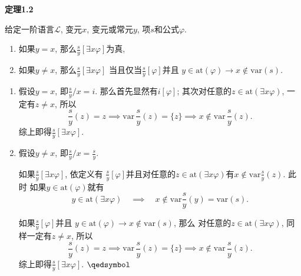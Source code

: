 \documentclass[UTF8]{ctexart}
\begin{document}
\vspace{10pt}

\hypertarget{sec:定理1.2}{}
\noindent\textbf{定理1.2}

给定一阶语言$\mathcal{L}$, 变元$x$, 变元或常元$y$, 项$s$和公式$\varphi$.
\vspace{3pt}
\begin{enumerate}
    \item 如果$y=x$, 那么$\displaystyle\frac{s}{y}[\exists x\varphi]$为真,
    \vspace{6pt}
    \item 如果$y\neq x$, 那么$\displaystyle\frac{s}{y}[\exists x\varphi]$
    当且仅当$\displaystyle\frac{s}{y}[\varphi]$并且
    $y\in\mathrm{at}(\varphi)\to x\notin\mathrm{var}(s)$.
\end{enumerate}


\begin{enumerate}
    \item 假设$y=x$, 即$\displaystyle\frac{s}{y}/x=i$. 那么首先显然有$i[\varphi]$;
    其次对任意的$z\in\mathrm{at}(\exists x\varphi)$, 一定有$z\neq x$, 所以
    \[
        \frac{s}{y}(z)=z\implies\mathrm{var}\,\frac{s}{y}(z)=\{z\}
        \implies x\notin\mathrm{var}\,\frac{s}{y}(z).
    \]
    综上即得$\displaystyle\frac{s}{y}[\exists x\varphi]$.

    \vspace{3pt}
    \item 假设$y\neq x$, 即$\displaystyle\frac{s}{y}/x=\frac{s}{y}$.
    
    \vspace{6pt}\hspace{2.17em}
    如果$\displaystyle\frac{s}{y}[\exists x\varphi]$, 依定义有
    $\displaystyle\frac{s}{y}[\varphi]$并且对任意的$z\in\mathrm{at}
    (\exists x\varphi)$有$\displaystyle x\notin\mathrm{var}\frac{s}{y}(z)$. 此时
    如果$y\in\mathrm{at}(\varphi)$就有
    \[
        y\in\mathrm{at}(\exists x\varphi)\quad\implies\quad
        x\notin\mathrm{var}\frac{s}{y}(y)=\mathrm{var}(s).
    \]
    
    \hspace{2.17em}
    如果$\displaystyle\frac{s}{y}[\varphi]$并且
    $y\in\mathrm{at}(\varphi)\to x\notin\mathrm{var}(s)$, 那么
    对任意的$z\in\mathrm{at}(\exists x\varphi)$, 同样一定有$z\neq x$, 所以
    \[
        \frac{s}{y}(z)=z\implies\mathrm{var}\,\frac{s}{y}(z)=\{z\}
        \implies x\notin\mathrm{var}\,\frac{s}{y}(z).
    \]
    综上即得$\displaystyle\frac{s}{y}[\exists x\varphi]$. \hfill $\qedsymbol$
\end{enumerate}
\end{document}
